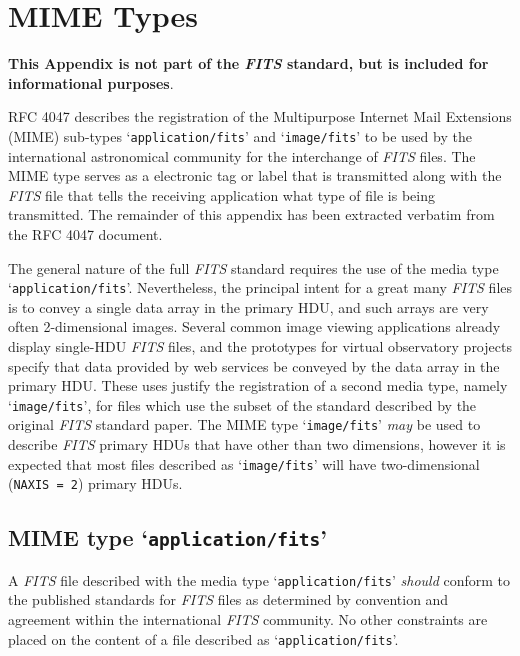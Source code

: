 \documentclass[11pt,makeidx]{book}     %
\begin{document}

\chapter{MIME Types}

{\bf This Appendix is not part of the {\em FITS\/} standard, 
but is included for informational purposes}.

RFC 4047 \cite{rfc4047} describes the registration of the Multipurpose Internet
Mail Extensions (MIME) sub-types `{\tt application/fits}' and `{\tt image/fits}'
to be used by the international astronomical community for the interchange 
of {\em FITS\/} files.   The MIME type serves as a electronic tag or label that is
transmitted along with the {\em FITS\/} file that tells the
receiving application what type of file is being transmitted.  
The remainder of this appendix has been extracted verbatim from the RFC 4047 document.

  The general nature of the full {\em FITS\/} standard requires the use of the
  media type `{\tt application/fits}'.  Nevertheless, the principal intent
  for a great many {\em FITS\/} files is to convey a single data array in the
  primary HDU, and such arrays are very often 2-dimensional images.  Several
  common image viewing applications already display single-HDU {\em FITS\/}
  files, and the prototypes for virtual observatory projects specify
  that data provided by web services be conveyed by the data array in
  the primary HDU.  These uses justify the registration of a second media
  type, namely `{\tt image/fits}', for files which use the subset of the
  standard described by the original {\em FITS\/} standard paper.
  The MIME type `{\tt image/fits}'
  {\em may} be used to describe {\em FITS\/} primary HDUs that have other than two
  dimensions, however it is expected that most files described as `{\tt image/fits}' will
  have two-dimensional ({\tt NAXIS = 2}) primary HDUs.

\section{MIME type `{\tt application/fits}'}

  A {\em FITS\/} file described with the media type `{\tt application/fits}' {\em should}
  conform to the published standards for {\em FITS\/} files as determined by
  convention and agreement within the international {\em FITS\/} community.  No
  other constraints are placed on the content of a file described as
  `{\tt application/fits}'.
\end{document}
